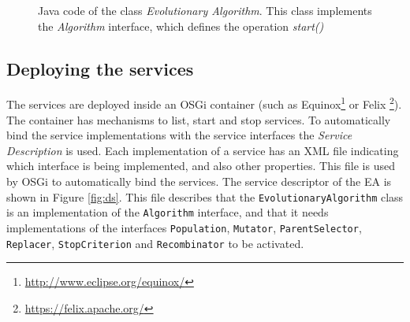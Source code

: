 
\begin{figure}
\usebox{\mintedbox}
\caption{Java code of the class {\em Evolutionary Algorithm}. This class implements the {\em Algorithm} interface, which defines the operation {\em start()} } 
\label{fig:javaevo} 
\end{figure}



\subsection{Deploying the services}

The services are deployed inside an OSGi container (such as Equinox\footnote{\url{http://www.eclipse.org/equinox/}} or Felix \footnote{\url{https://felix.apache.org/}}). The container has mechanisms to list, start and stop services. To automatically bind the service implementations with the service interfaces                                
 the {\em Service Description} is used. %
Each implementation of a service has an XML file indicating which interface is being implemented, and also other properties. This file is used by OSGi to automatically bind the services. The service descriptor of the EA is shown in Figure \ref{fig:ds}. This file describes that the \texttt{EvolutionaryAlgorithm} class is an implementation of the \texttt{Algorithm} interface, and that it needs implementations of the interfaces \texttt{Population}, \texttt{Mutator}, \texttt{ParentSelector}, \texttt{Replacer}, \texttt{StopCriterion} and \texttt{Recombinator} to be activated. 

